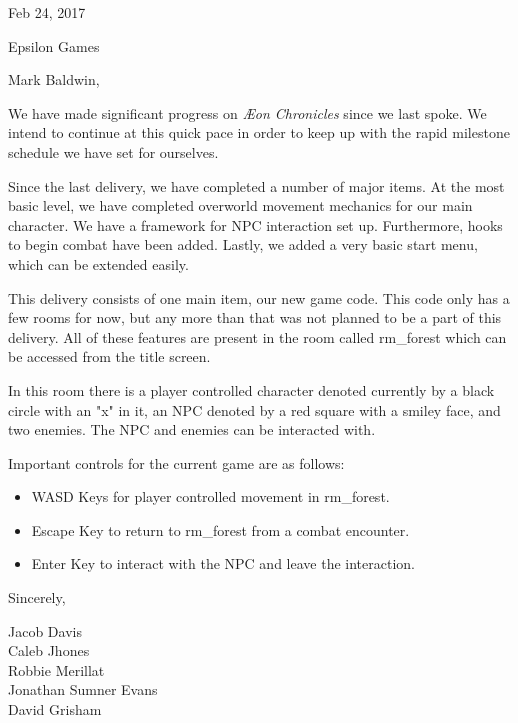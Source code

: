 \documentclass[12pt]{article}
\newcommand\tab[1][.5in]{\hspace*{#1}}
\begin{document}
\hfill Feb 24, 2017

\hfill Epsilon Games

Mark Baldwin,

We have made significant progress on \textit{{\AE}on Chronicles} since we last
spoke. We intend to continue at this quick pace in order to keep up with the
rapid milestone schedule we have set for ourselves.

Since the last delivery, we have completed a number of major items. At the most
basic level, we have completed overworld movement mechanics for our main
character. We have a framework for NPC interaction set up. Furthermore, hooks
to begin combat have been added. Lastly, we added a very basic start menu, which
can be extended easily.

This delivery consists of one main item, our new game code. This code only has
a few rooms for now, but any more than that was not planned to be a part of 
this delivery. All of these features are present in the room called rm\_forest 
which can be accessed from the title screen.

In this room there is a player controlled character denoted currently by a 
black circle with an "x" in it, an NPC denoted by a red square with a smiley 
face, and two enemies. The NPC and enemies can be interacted with.

Important controls for the current game are as follows:

\begin{itemize}
    \item WASD Keys for player controlled movement in rm\_forest.
    \item Escape Key to return to rm\_forest from a combat encounter.
    \item Enter Key to interact with the NPC and leave the interaction.
\end{itemize}

Sincerely,

\tab Jacob Davis \\
\tab Caleb Jhones \\
\tab Robbie Merillat \\
\tab Jonathan Sumner Evans \\
\tab David Grisham \\
\end{document}
